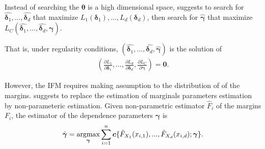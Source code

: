 Instead of searching the $\bm{\theta}$ is a high dimensional space, \citet{joe1997multivariate} suggests to
search for $\hat{\bm{\delta}_1},..., \hat{\bm{\delta}_d}$ that maximize $L_1(\bm{\delta}_1), ..., L_d(\bm{\delta}_d)$,
then search for $\hat{\bm{\gamma}}$ that maximize $L_C(\hat{\bm{\delta}_1},..., \hat{\bm{\delta}_d}, \bm{\gamma})$.

That is, under regularity conditions, $(\hat{\bm{\delta}_1},..., \hat{\bm{\delta}_d}, \hat{\bm{\gamma}})$ is the solution of
\begin{align}
    \left( \frac{\partial L_1}{\partial \bm{\delta}_1}, ..., \frac{\partial L_d}{\partial \bm{\delta}_d},
    \frac{\partial L_C}{\partial \bm{\gamma}}\right) = \bm{0}.
    \end{align}

However, the IFM requires making assumption to the distribution of of the margins.
\citet{genest1995semiparametric} suggests to replace the estimation of marginals parameters estimation by non-parameteric estimation.
Given non-parametric estimator $\hat{F}_i$ of the margins $F_i$, the estimator of the dependence parameters $\bm{\gamma}$ is
\begin{align}
    \hat{\bm{\gamma}} = \argmax_{\bm{\gamma}} \sum_{i=1}^n \bm{c}\{ \hat{F}_{X_1}(x_{i,1}), ..., \hat{F}_{X_d}(x_{i,d});\bm{\gamma}\}.
    \end{align}




